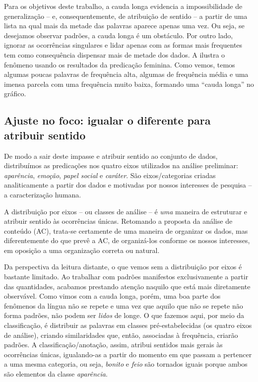 \documentclass[portuguese]{textolivre}
\begin{document}
Para os objetivos deste trabalho, a cauda longa evidencia a impossibilidade de generalização – e, consequentemente, de atribuição de sentido – a partir de uma lista na qual mais da metade das palavras aparece apenas uma vez. Ou seja, se desejamos observar padrões, a cauda longa é um obstáculo. Por outro lado, ignorar as ocorrências singulares e lidar apenas com as formas mais frequentes tem como consequência dispensar mais de metade dos dados. A  ilustra o fenômeno usando os resultados da predicação feminina. Como vemos, temos algumas poucas palavras de frequência alta, algumas de frequência média e uma imensa parcela com uma frequência muito baixa, formando uma “cauda longa” no gráfico.

\subsection{Ajuste no foco: igualar o diferente para atribuir sentido}\label{sec-conduta}
De modo a sair deste impasse e atribuir sentido ao conjunto de dados, distribuímos as predicações nos quatro eixos utilizados na análise preliminar: \textit{aparência}, \textit{emoção}, \textit{papel social} e \textit{caráter}. São eixos/categorias criadas analiticamente a partir dos dados e motivadas por nossos interesses de pesquisa – a caracterização humana.

A distribuição por eixos – ou classes de análise – é \textit{uma} maneira de estruturar e atribuir sentido às ocorrências únicas. Retomando a proposta da análise de conteúdo (AC), trata-se certamente de uma maneira de organizar os dados, mas diferentemente do que prevê a AC, de organizá-los conforme os nossos interesses, em oposição a uma organização correta ou natural.

Da perspectiva da leitura distante, o que vemos sem a distribuição por eixos é bastante limitado. Ao trabalhar com padrões manifestos exclusivamente a partir das quantidades, acabamos prestando atenção naquilo que está mais diretamente observável. Como vimos com a cauda longa, porém, uma boa parte dos fenômenos da língua não se repete e uma vez que aquilo que não se repete não forma padrões, não podem ser \textit{lidos} de longe. O que fazemos aqui, por meio da classificação, é distribuir as palavras em classes pré-estabelecidas (os quatro eixos de análise), criando similaridades que, então, associadas à frequência, criarão padrões. A classificação/anotação, assim, atribui sentidos mais gerais às ocorrências únicas, igualando-as a partir do momento em que passam a pertencer a uma mesma categoria, ou seja, \textit{bonito} e \textit{feio} são tornados iguais porque ambos são elementos da classe \textit{aparência}.
\end{document}
